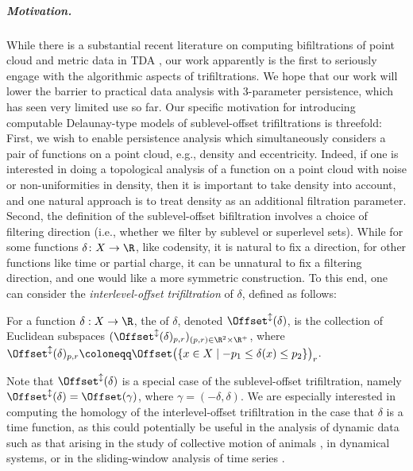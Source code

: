 %
\subparagraph{Motivation.}
While there is a substantial recent literature on computing bifiltrations of point cloud and metric data in TDA \cite{corbet2023computing,alonsoDelaunayBifiltrationsFunctions2024,blaser2024core,lesnick2024nerve, alonso2024sparse,alonso2023filtration}, our work apparently is the first to seriously engage with the algorithmic aspects of trifiltrations.  We hope that our work will lower the barrier to practical data analysis with 3-parameter persistence, which has seen very limited use so far.  
%
Our specific motivation for introducing computable Delaunay-type models of sublevel-offset trifiltrations is threefold:  First, we wish to enable persistence analysis which simultaneously considers a pair of functions on a point cloud, e.g., density and eccentricity.  
Indeed, if one is interested in doing a topological analysis of a function on a point cloud with noise or non-uniformities in density, then it is important to take density into account, and one natural approach is to treat density as an additional filtration parameter.
%
Second, the definition of the sublevel-offset bifiltration involves a choice of filtering direction (i.e., whether we filter by sublevel or superlevel sets). While for some functions $\delta\colon X\to \R$, like codensity, it is natural to fix a direction, for other functions like time or partial charge, it can be unnatural to fix a filtering direction, and one would like a more symmetric construction. To this end, one can consider the \emph{interlevel-offset trifiltration} of $\delta$, defined as follows:
\begin{definition}
For a function $\delta: X \to \R$, the 
of $\delta$, denoted $\Offset^{\updownarrow}(\delta)$, is the collection of Euclidean subspaces
$
(\Offset^{\updownarrow}(\delta)_{p, r})_{(p, r) \in \R^2 \times \R^+}$, where $\Offset^{\updownarrow}(\delta)_{p, r} \coloneqq \Offset\bigl(\{x \in X \mid  -p_1 \leq \delta(x) \leq p_2\}\bigr)_r$.%
%
\end{definition}
Note that $\Offset^{\updownarrow}(\delta)$ is a special case of the sublevel-offset trifiltration, namely $\Offset^{\updownarrow}(\delta)=\Offset(\gamma)$, where $\gamma=(-\delta,\delta)$. We are especially interested in computing the homology of the interlevel-offset trifiltration in the case that $\delta$ is a time function, as this could potentially be useful in the analysis of dynamic data such as that arising in the study of collective motion of animals \cite{adams2020topological}, in dynamical systems, or in the sliding-window analysis of time series \cite{perea2015sliding}.
